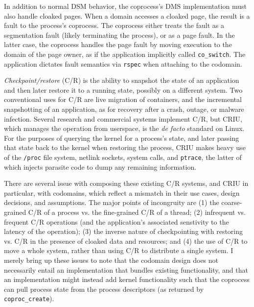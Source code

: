 In addition to normal DSM behavior, the coprocess's DMS implementation must
also handle cloaked pages.
%
When a domain accesses a cloaked page, the result is a fault to the process's
coprocess.
%
The coprocess either treats the fault as a segmentation fault (likely
terminating the process), or as a page fault.
%
In the latter case, the coprocess handles the page fault by moving execution to
the domain of the page owner, as if the application implicitly called
\texttt{co\_switch}.
%
The application dictates fault semantics via \texttt{rspec}
when attaching to the codomain.


%
\emph{Checkpoint/restore} (C/R) is the ability to snapshot the state of an
application and then later restore it to a running state, possibly
on a different system.
%
Two conventional uses for C/R are live migration of containers,
and the incremental snapshotting of an application, as for recovery
after a crash, outage, or malware infection.
%
Several research and commercial systems implement C/R, but CRIU, which manages
the operation from userspace, is the \emph{de facto} standard on Linux.
%
For the purposes of querying the kernel for a process's state, and later
passing that state back to the kernel when restoring the process,
CRIU makes heavy use of the \texttt{/proc} file system, netlink sockets,
system calls, and \texttt{ptrace}, the latter of which injects parasite code
to dump any remaining information.


There are several issue with composing these existing C/R systems, and CRIU in
particular, with codomains, which reflect a mismatch in their use cases, design
decisions, and assumptions.
%
The major points of incongruity are (1) the coarse-grained C/R of a process vs.
the fine-grained C/R of a thread; (2) infrequent vs. frequent C/R operations
(and the application's associated senstivity to the latency of the operation);
(3) the inverse nature of checkpointing with restoring vs. C/R in the presence
of cloaked data and resources; and (4) the use of C/R to move a whole system,
rather than using C/R to distribute a single system.
%
I merely bring up these issues to note that the codomain design does not
necessarily entail an implementation that bundles existing functionality, and
that an implementation might instead add kernel functionality such that the
coprocess can pull process state from the process descriptors (as returned by
\texttt{coproc\_create}).



